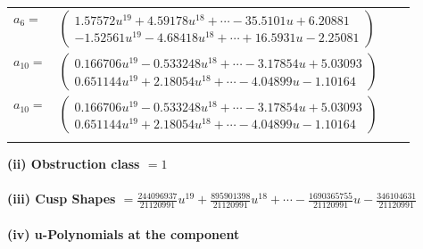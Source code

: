 \documentclass[1p]{elsarticle_modified}
\theoremstyle{definition}
\begin{document}
\begin{tabular}{m{7pt} m{180pt} m{7pt} m{180pt} }
\flushright $a_{6}=$&$\begin{pmatrix}1.57572 u^{19}+4.59178 u^{18}+\cdots-35.5101 u+6.20881\\-1.52561 u^{19}-4.68418 u^{18}+\cdots+16.5931 u-2.25081\end{pmatrix}$ \\
\flushright $a_{10}=$&$\begin{pmatrix}0.166706 u^{19}-0.533248 u^{18}+\cdots-3.17854 u+5.03093\\0.651144 u^{19}+2.18054 u^{18}+\cdots-4.04899 u-1.10164\end{pmatrix}$\\ \flushright $a_{10}=$&$\begin{pmatrix}0.166706 u^{19}-0.533248 u^{18}+\cdots-3.17854 u+5.03093\\0.651144 u^{19}+2.18054 u^{18}+\cdots-4.04899 u-1.10164\end{pmatrix}$\\&\end{tabular}
\flushleft \textbf{(ii) Obstruction class $= 1$}\\~\\
\flushleft \textbf{(iii) Cusp Shapes $= \frac{244096937}{21120991} u^{19}+\frac{895901398}{21120991} u^{18}+\cdots-\frac{1690365755}{21120991} u-\frac{346104631}{21120991}$}\\~\\
\newpage\renewcommand{\arraystretch}{1}
\flushleft \textbf{(iv) u-Polynomials at the component}\newline \\
\end{document}
